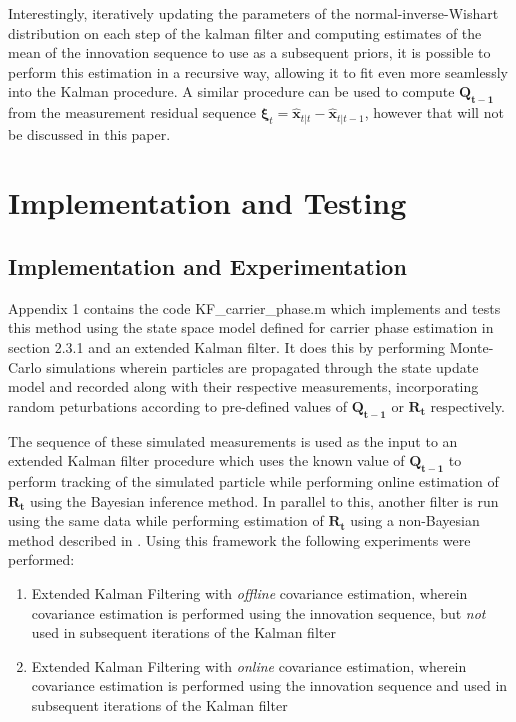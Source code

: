 \documentclass[11pt]{article}
\begin{document}
\noindent Interestingly, iteratively updating the parameters of the normal-inverse-Wishart distribution on each step of the kalman filter and computing estimates of the mean of the innovation sequence to use as a subsequent priors, it is possible to perform this estimation in a recursive way, allowing it to fit even more seamlessly into the Kalman procedure. A similar procedure can be used to compute $\mathbf{Q_{t-1}}$ from the measurement residual sequence $\bm{\xi}_t = \hat{\mathbf{x}}_{t|t} - \hat{\mathbf{x}}_{t|t-1}$, however that will not be discussed in this paper.

\section{Implementation and Testing}

\subsection{Implementation and Experimentation}

Appendix 1 contains the code KF\_carrier\_phase.m which implements and tests this method using the state space model defined for carrier phase estimation in section 2.3.1 and an extended Kalman filter. It does this by performing Monte-Carlo simulations wherein particles are propagated through the state update model and recorded along with their respective measurements, incorporating random peturbations according to pre-defined values of $\mathbf{Q_{t-1}}$ or $\mathbf{R_{t}}$ respectively.

The sequence of these simulated measurements is used as the input to an extended Kalman filter procedure which uses the known value of $\mathbf{Q_{t-1}}$ to perform tracking of the simulated particle while performing online estimation of $\mathbf{R_{t}}$ using the Bayesian inference method. In parallel to this, another filter is run using the same data while performing estimation of $\mathbf{R_{t}}$ using a non-Bayesian method described in \cite{Myer-76}. Using this framework the following experiments were performed:

\begin{enumerate}
    \item Extended Kalman Filtering with \textit{offline} covariance estimation, wherein covariance estimation is performed using the innovation sequence, but \textit{not} used in subsequent iterations of the Kalman filter
    \item Extended Kalman Filtering with \textit{online} covariance estimation, wherein covariance estimation is performed using the innovation sequence and used in subsequent iterations of the Kalman filter
\end{enumerate}
\end{document}
